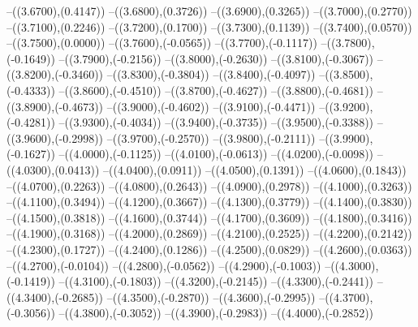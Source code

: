 {	--({\sx*(3.6700)},{\sy*(0.4147)})
	--({\sx*(3.6800)},{\sy*(0.3726)})
	--({\sx*(3.6900)},{\sy*(0.3265)})
	--({\sx*(3.7000)},{\sy*(0.2770)})
	--({\sx*(3.7100)},{\sy*(0.2246)})
	--({\sx*(3.7200)},{\sy*(0.1700)})
	--({\sx*(3.7300)},{\sy*(0.1139)})
	--({\sx*(3.7400)},{\sy*(0.0570)})
	--({\sx*(3.7500)},{\sy*(0.0000)})
	--({\sx*(3.7600)},{\sy*(-0.0565)})
	--({\sx*(3.7700)},{\sy*(-0.1117)})
	--({\sx*(3.7800)},{\sy*(-0.1649)})
	--({\sx*(3.7900)},{\sy*(-0.2156)})
	--({\sx*(3.8000)},{\sy*(-0.2630)})
	--({\sx*(3.8100)},{\sy*(-0.3067)})
	--({\sx*(3.8200)},{\sy*(-0.3460)})
	--({\sx*(3.8300)},{\sy*(-0.3804)})
	--({\sx*(3.8400)},{\sy*(-0.4097)})
	--({\sx*(3.8500)},{\sy*(-0.4333)})
	--({\sx*(3.8600)},{\sy*(-0.4510)})
	--({\sx*(3.8700)},{\sy*(-0.4627)})
	--({\sx*(3.8800)},{\sy*(-0.4681)})
	--({\sx*(3.8900)},{\sy*(-0.4673)})
	--({\sx*(3.9000)},{\sy*(-0.4602)})
	--({\sx*(3.9100)},{\sy*(-0.4471)})
	--({\sx*(3.9200)},{\sy*(-0.4281)})
	--({\sx*(3.9300)},{\sy*(-0.4034)})
	--({\sx*(3.9400)},{\sy*(-0.3735)})
	--({\sx*(3.9500)},{\sy*(-0.3388)})
	--({\sx*(3.9600)},{\sy*(-0.2998)})
	--({\sx*(3.9700)},{\sy*(-0.2570)})
	--({\sx*(3.9800)},{\sy*(-0.2111)})
	--({\sx*(3.9900)},{\sy*(-0.1627)})
	--({\sx*(4.0000)},{\sy*(-0.1125)})
	--({\sx*(4.0100)},{\sy*(-0.0613)})
	--({\sx*(4.0200)},{\sy*(-0.0098)})
	--({\sx*(4.0300)},{\sy*(0.0413)})
	--({\sx*(4.0400)},{\sy*(0.0911)})
	--({\sx*(4.0500)},{\sy*(0.1391)})
	--({\sx*(4.0600)},{\sy*(0.1843)})
	--({\sx*(4.0700)},{\sy*(0.2263)})
	--({\sx*(4.0800)},{\sy*(0.2643)})
	--({\sx*(4.0900)},{\sy*(0.2978)})
	--({\sx*(4.1000)},{\sy*(0.3263)})
	--({\sx*(4.1100)},{\sy*(0.3494)})
	--({\sx*(4.1200)},{\sy*(0.3667)})
	--({\sx*(4.1300)},{\sy*(0.3779)})
	--({\sx*(4.1400)},{\sy*(0.3830)})
	--({\sx*(4.1500)},{\sy*(0.3818)})
	--({\sx*(4.1600)},{\sy*(0.3744)})
	--({\sx*(4.1700)},{\sy*(0.3609)})
	--({\sx*(4.1800)},{\sy*(0.3416)})
	--({\sx*(4.1900)},{\sy*(0.3168)})
	--({\sx*(4.2000)},{\sy*(0.2869)})
	--({\sx*(4.2100)},{\sy*(0.2525)})
	--({\sx*(4.2200)},{\sy*(0.2142)})
	--({\sx*(4.2300)},{\sy*(0.1727)})
	--({\sx*(4.2400)},{\sy*(0.1286)})
	--({\sx*(4.2500)},{\sy*(0.0829)})
	--({\sx*(4.2600)},{\sy*(0.0363)})
	--({\sx*(4.2700)},{\sy*(-0.0104)})
	--({\sx*(4.2800)},{\sy*(-0.0562)})
	--({\sx*(4.2900)},{\sy*(-0.1003)})
	--({\sx*(4.3000)},{\sy*(-0.1419)})
	--({\sx*(4.3100)},{\sy*(-0.1803)})
	--({\sx*(4.3200)},{\sy*(-0.2145)})
	--({\sx*(4.3300)},{\sy*(-0.2441)})
	--({\sx*(4.3400)},{\sy*(-0.2685)})
	--({\sx*(4.3500)},{\sy*(-0.2870)})
	--({\sx*(4.3600)},{\sy*(-0.2995)})
	--({\sx*(4.3700)},{\sy*(-0.3056)})
	--({\sx*(4.3800)},{\sy*(-0.3052)})
	--({\sx*(4.3900)},{\sy*(-0.2983)})
	--({\sx*(4.4000)},{\sy*(-0.2852)})
}
